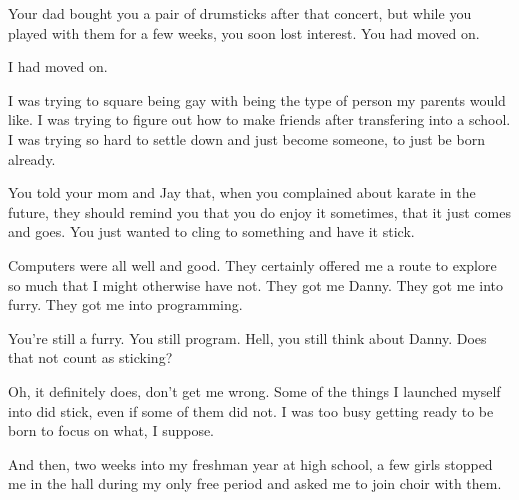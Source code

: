 \begin{paracol}{2}
\begin{leftcolumn}
\begin{ally}
Your dad bought you a pair of drumsticks after that concert, but while you played with them for a few weeks, you soon lost interest. You had moved on.
\end{ally}
I had moved on.

I was trying to square being gay with being the type of person my parents would like. I was trying to figure out how to make friends after transfering into a school. I was trying so hard to settle down and just become someone, to just be born already.

\begin{ally}
You told your mom and Jay that, when you complained about karate in the future, they should remind you that you do enjoy it sometimes, that it just comes and goes. You just wanted to cling to something and have it stick.
\end{ally}
Computers were all well and good. They certainly offered me a route to explore so much that I might otherwise have not. They got me Danny. They got me into furry. They got me into programming.

\begin{ally}
You're still a furry. You still program. Hell, you still think about Danny. Does that not count as sticking?
\end{ally}
Oh, it definitely does, don't get me wrong. Some of the things I launched myself into did stick, even if some of them did not. I was too busy getting ready to be born to focus on what, I suppose.

And then, two weeks into my freshman year at high school, a few girls stopped me in the hall during my only free period and asked me to join choir with them.


\end{leftcolumn}
\end{paracol}
